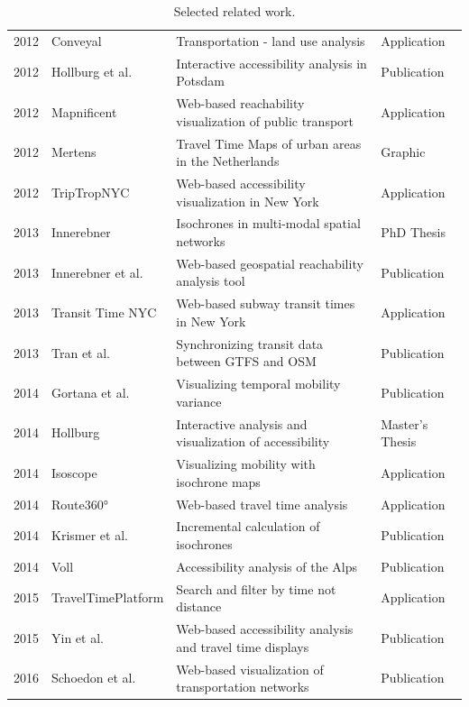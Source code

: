 \begin{table}[htp]
\begin{tabular}{r|l|l|l}
      2012 & Conveyal \cite{Conveyal} & Transportation - land use analysis  & Application  \\
      2012 & Hollburg et al. \cite{hollburghier} & Interactive accessibility analysis in Potsdam & Publication  \\
      2012 & Mapnificent \cite{Mapnificent}  & Web-based reachability visualization of public transport  & Application  \\
      2012 & Mertens \cite{meertens2012} & Travel Time Maps of urban areas in the Netherlands  & Graphic  \\
      2012 & TripTropNYC \cite{TriptropNYC} & Web-based accessibility visualization in New York  & Application  \\
      2013 & Innerebner \cite{Innerebner2013} & Isochrones in multi-modal spatial networks  & PhD Thesis  \\
      2013 & Innerebner et al. \cite{innerebner2013isoga} & Web-based geospatial reachability analysis tool  & Publication  \\
      2013 & Transit Time NYC \cite{TransitTimeNYC} & Web-based subway transit times in New York & Application \\
      2013 & Tran et al. \cite{tran2013go_sync} & Synchronizing transit data between GTFS and OSM  & Publication  \\
      2014 & Gortana et al. \cite{gortanaisoscope} & Visualizing temporal mobility variance  & Publication  \\
      2014 & Hollburg \cite{Hollburg2014} & Interactive analysis and visualization of accessibility & Master's Thesis  \\
      2014 & Isoscope \cite{Isoscope} & Visualizing mobility with isochrone maps  & Application  \\
      2014 & Route360° \cite{Route360} & Web-based travel time analysis  & Application  \\
      2014 & Krismer et al. \cite{krismer2014incremental} & Incremental calculation of isochrones  & Publication  \\
      2014 & Voll \cite{vollerreichbarkeiten} & Accessibility analysis of the Alps  & Publication  \\
      2015 & TravelTimePlatform \cite{TravelTimePlatform} & Search and filter by time not distance  & Application  \\
      2015 & Yin et al. \cite{yin2015understanding} & Web-based accessibility analysis and travel time displays  & Publication  \\
      2016 & Schoedon et al. \cite{STHD2016} & Web-based visualization of transportation networks  & Publication  \\
    \end{tabular}
    \caption{Selected related work.}
    \label{tab:overv:relat}
  \end{table}

